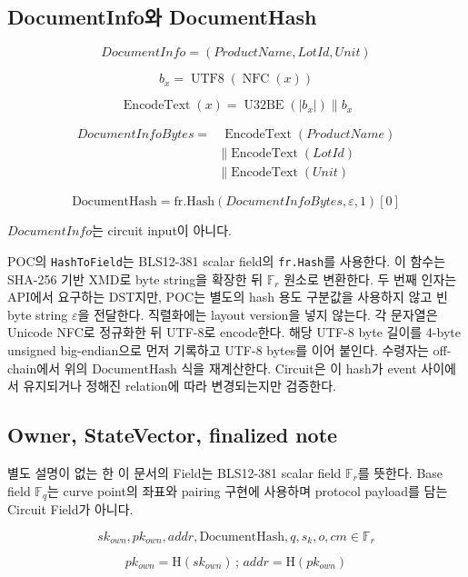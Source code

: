 \documentclass[11pt,a4paper]{extarticle}
\newcommand{\Hash}{\mathrm{H}}
\newcommand{\FrHash}{\mathrm{fr.Hash}}
\newcommand{\DocumentHash}{\mathrm{DocumentHash}}
\begin{document}
\subsection{DocumentInfo와 DocumentHash}

\[
  \mathit{DocumentInfo}=(ProductName,LotId,Unit)
\]

\[
  b_x=\operatorname{UTF8}(\operatorname{NFC}(x))
\]

\[
  \operatorname{EncodeText}(x)
  =
  \operatorname{U32BE}(|b_x|)
  \mathbin{\|}b_x
\]

\[
  \begin{aligned}
  \mathit{DocumentInfoBytes}
  ={}&\operatorname{EncodeText}(ProductName)\\
     &\mathbin{\|}\operatorname{EncodeText}(LotId)\\
     &\mathbin{\|}\operatorname{EncodeText}(Unit)
  \end{aligned}
\]

\[
  \DocumentHash
  =
  \FrHash(
    \mathit{DocumentInfoBytes},
    \varepsilon,1
  )[0]
\]

$\mathit{DocumentInfo}$는 circuit input이 아니다.

POC의 \texttt{HashToField}는 BLS12-381 scalar field의 \texttt{fr.Hash}를
사용한다. 이 함수는 SHA-256 기반 XMD로 byte string을 확장한 뒤
$\mathbb{F}_r$ 원소로 변환한다. 두 번째 인자는 API에서 요구하는 DST지만,
POC는 별도의 hash 용도 구분값을 사용하지 않고 빈 byte string $\varepsilon$을
전달한다. 직렬화에는 layout version을 넣지 않는다. 각 문자열은 Unicode NFC로
정규화한 뒤 UTF-8로 encode한다. 해당 UTF-8 byte 길이를 4-byte unsigned
big-endian으로 먼저 기록하고 UTF-8 bytes를 이어 붙인다. 수령자는 off-chain에서 위의
$\DocumentHash$ 식을 재계산한다.
Circuit은 이 hash가 event 사이에서 유지되거나 정해진 relation에 따라
변경되는지만 검증한다.

\subsection{Owner, StateVector, finalized note}

별도 설명이 없는 한 이 문서의 Field는 BLS12-381 scalar field
$\mathbb{F}_r$를 뜻한다. Base field $\mathbb{F}_q$는 curve point의 좌표와
pairing 구현에 사용하며 protocol payload를 담는 Circuit Field가 아니다.

\[
  sk_{own},pk_{own},addr,\DocumentHash,q,s_k,o,cm
  \in\mathbb{F}_r
\]

\[
  pk_{own}=\Hash(sk_{own})
  \,;\,
  addr=\Hash(pk_{own})
\]
\end{document}
